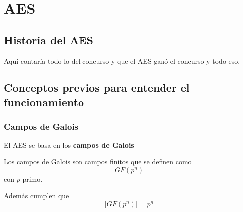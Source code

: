  \chapter{AES}
 \section{Historia del AES}
 Aquí contaría todo lo del concurso y que el AES ganó el concurso y todo eso.
 \section{Conceptos previos para entender el funcionamiento}
 \subsection{Campos de Galois}
 El AES se basa en los \textbf{campos de Galois}
 \begin{defn}
 	Los campos de Galois son campos finitos que se definen como
 	$$GF(p^n)$$
 	con $p$ primo.
 	
 	Además cumplen que 
 	$$|GF(p^n)| = p^n$$
 \end{defn}
 
